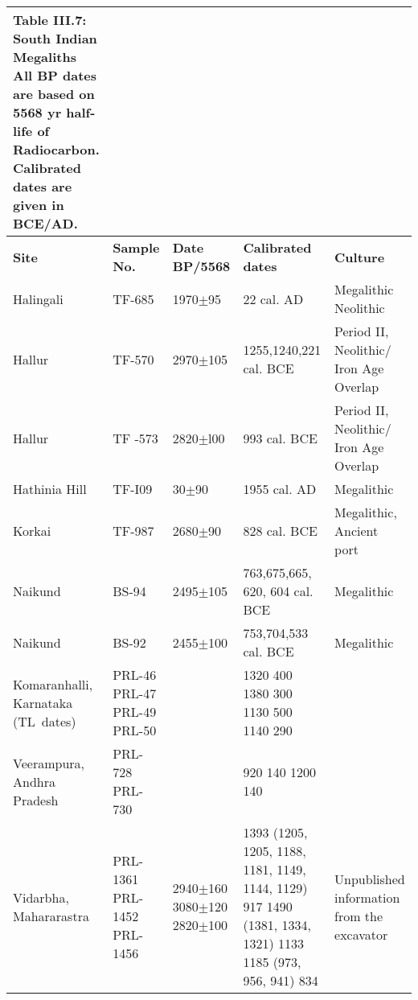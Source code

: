 {\setlength\tabcolsep{2pt}
{\fontsize{7}{9}\selectfont
\begin{longtable}{|p{1.5cm}|p{1cm}|p{1.2cm}|p{1.8cm}|p{2.5cm}|}
\caption*{Table III.7: South Indian Megaliths\\
All BP dates are based on 5568 yr half-life of Radiocarbon. \\
Calibrated dates are given in BCE/AD.}\label{table III.7}\\
\hline
\multicolumn{1}{|m{1.5cm}|}{\centering \textbf{Site}} &\multicolumn{1}{m{1cm}|}{\centering \textbf{Sample No.}}&\multicolumn{1}{m{1.2cm}|}{\centering \textbf{Date BP/5568}} & \multicolumn{1}{m{1.8cm}|}{\centering \textbf{Calibrated dates}}& \multicolumn{1}{m{2.5cm}|}{\centering \textbf{Culture}}\\
\endfirsthead
\hline
\endhead
\hline
\endfoot
\hline
Halingali & TF-685 & 1970$\pm$95 & 22 cal. AD & Megalithic Neolithic\\
Hallur & TF-570 & 2970$\pm$105 & 1255,1240,221 cal. BCE & Period II, Neolithic/ Iron Age Overlap\\
Hallur & TF -573 & 2820$\pm$l00 & 993 cal. BCE & Period II, Neolithic/ Iron Age Overlap\\
Hathinia Hill & TF-I09 & 30$\pm$90 & 1955 cal. AD & Megalithic\\
Korkai & TF-987 & 2680$\pm$90 & 828 cal. BCE & Megalithic, Ancient port\\
Naikund & BS-94 & 2495$\pm$105 & 763,675,665, 620, 604 cal. BCE &Megalithic\\
Naikund & BS-92 & 2455$\pm$100 & 753,704,533 cal. BCE &Megalithic\\
Komaranhalli, Karnataka \hbox{(TL dates)}  & PRL-46 PRL-47 PRL-49 PRL-50 &&1320 400 1380 300 1130 500 1140 290 & \\
Veerampura, Andhra Pradesh & PRL-728 PRL-730 && 920 140 1200 140 & \\
Vidarbha, \hbox{Mahararastra} & PRL-1361  PRL-1452  PRL-1456 & 2940$\pm$160 3080$\pm$120 2820$\pm$100 & 1393 (1205, 1205, 1188, 1181, 1149, 1144, 1129) 917 1490 (1381, 1334, 1321) 1133 1185 (973, 956, 941) 834 & Unpublished information from the excavator
\end{longtable}
}}

